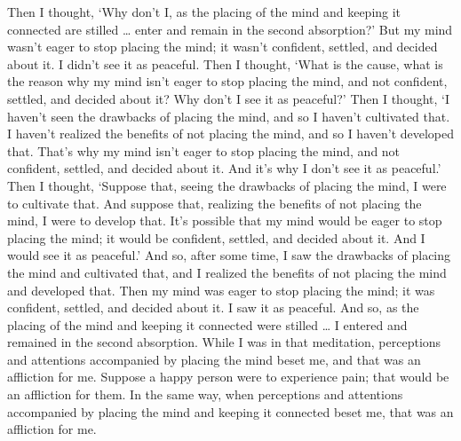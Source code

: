 \documentclass[12pt,openany]{book}%
\begin{document}
Then I thought, ‘Why don’t I, as the placing of the mind and keeping it connected are stilled … enter and remain in the second absorption?’ But my mind wasn’t eager to stop placing the mind; it wasn’t confident, settled, and decided about it. I didn’t see it as peaceful. Then I thought, ‘What is the cause, what is the reason why my mind isn’t eager to stop placing the mind, and not confident, settled, and decided about it? Why don’t I see it as peaceful?’ Then I thought, ‘I haven’t seen the drawbacks of placing the mind, and so I haven’t cultivated that. I haven’t realized the benefits of not placing the mind, and so I haven’t developed that. That’s why my mind isn’t eager to stop placing the mind, and not confident, settled, and decided about it. And it’s why I don’t see it as peaceful.’ Then I thought, ‘Suppose that, seeing the drawbacks of placing the mind, I were to cultivate that. And suppose that, realizing the benefits of not placing the mind, I were to develop that. It’s possible that my mind would be eager to stop placing the mind; it would be confident, settled, and decided about it. And I would see it as peaceful.’ And so, after some time, I saw the drawbacks of placing the mind and cultivated that, and I realized the benefits of not placing the mind and developed that. Then my mind was eager to stop placing the mind; it was confident, settled, and decided about it. I saw it as peaceful. And so, as the placing of the mind and keeping it connected were stilled … I entered and remained in the second absorption. While I was in that meditation, perceptions and attentions accompanied by placing the mind beset me, and that was an affliction for me. Suppose a happy person were to experience pain; that would be an affliction for them. In the same way, when perceptions and attentions accompanied by placing the mind and keeping it connected beset me, that was an affliction for me. 
\end{document}
